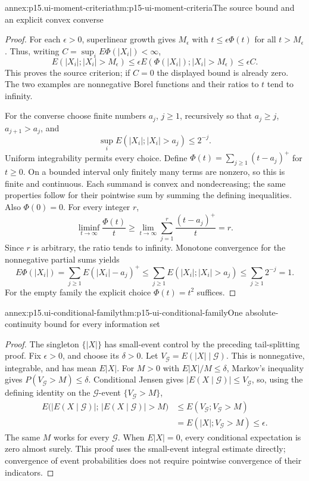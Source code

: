 \begin{annexitem}{annex:p15.ui-moment-criteria}{thm:p15-ui-moment-criteria}{The source bound and an explicit convex converse}
\begin{proof}
For each \(\epsilon>0\), superlinear growth gives \(M_\epsilon\) with
\(t\leq\epsilon\Phi(t)\) for all \(t>M_\epsilon\).
Thus, writing \(C=\sup_iE\Phi(|X_i|)<\infty\),
\[
   E(|X_i|;|X_i|>M_\epsilon)
       \leq\epsilon E(\Phi(|X_i|);|X_i|>M_\epsilon)
       \leq\epsilon C.
\]
This proves the source criterion; if \(C=0\) the displayed bound is
already zero. The two examples are nonnegative Borel functions and
their ratios to \(t\) tend to infinity.

For the converse choose finite numbers \(a_j\), \(j\geq1\), recursively
so that \(a_j\geq j\), \(a_{j+1}>a_j\), and
\[
                   \sup_iE(|X_i|;|X_i|>a_j)\leq2^{-j}.
\]
Uniform integrability permits every choice. Define
\(\Phi(t)=\sum_{j\geq1}(t-a_j)^+\) for \(t\geq0\).
On a bounded interval only finitely many terms are nonzero, so this
is finite and continuous. Each summand is convex and nondecreasing;
the same properties follow for their pointwise sum by summing the
defining inequalities. Also \(\Phi(0)=0\). For every integer \(r\),
\[
             \liminf_{t\to\infty}\frac{\Phi(t)}t
                  \geq\lim_{t\to\infty}
                       \sum_{j=1}^r\frac{(t-a_j)^+}t=r.
\]
Since \(r\) is arbitrary, the ratio tends to infinity.
Monotone convergence for the nonnegative partial sums yields
\[
 E\Phi(|X_i|)
     =\sum_{j\geq1}E(|X_i|-a_j)^+
     \leq\sum_{j\geq1}E(|X_i|;|X_i|>a_j)
     \leq\sum_{j\geq1}2^{-j}=1.
\]
For the empty family the explicit choice \(\Phi(t)=t^2\) suffices.
\end{proof}
\end{annexitem}

\begin{annexitem}{annex:p15.ui-conditional-family}{thm:p15-ui-conditional-family}{One absolute-continuity bound for every information set}
\begin{proof}
The singleton \(\{|X|\}\) has small-event control by the preceding
tail-splitting proof. Fix \(\epsilon>0\), and choose its \(\delta>0\).
Let \(V_{\mathcal G}=E(|X|\mid\mathcal G)\). This is nonnegative,
integrable, and has mean \(E|X|\). For \(M>0\) with \(E|X|/M\leq\delta\),
Markov's inequality gives \(P(V_{\mathcal G}>M)\leq\delta\).
Conditional Jensen gives \(|E(X\mid\mathcal G)|\leq V_{\mathcal G}\),
so, using the defining identity on the \(\mathcal G\)-event
\(\{V_{\mathcal G}>M\}\),
\[
 \begin{aligned}
 E\bigl(|E(X\mid\mathcal G)|;\,|E(X\mid\mathcal G)|>M\bigr)
  &\leq E(V_{\mathcal G};V_{\mathcal G}>M)\\
  &=E(|X|;V_{\mathcal G}>M)\leq\epsilon .
 \end{aligned}
\]
The same \(M\) works for every \(\mathcal G\).
When \(E|X|=0\), every conditional expectation is zero almost surely.
This proof uses the small-event integral estimate directly; convergence
of event probabilities does not require pointwise convergence of their
indicators.
\end{proof}
\end{annexitem}

